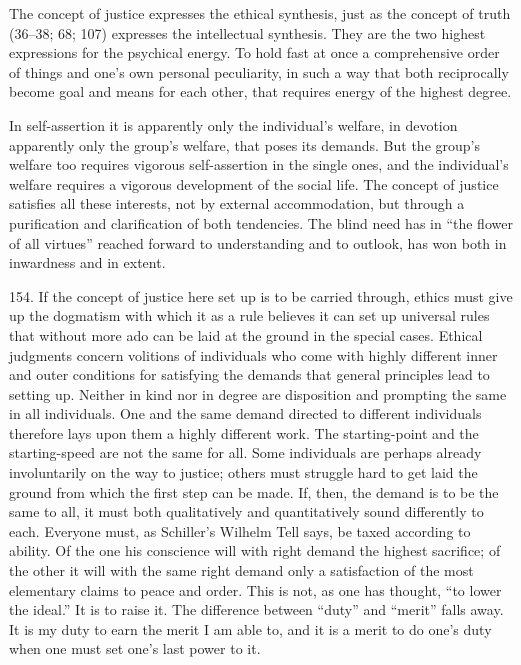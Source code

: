 \documentclass[12pt,a4paper]{book}
\newcommand{\opage}[1]{\marginnote{\footnotesize\textit{[#1]}}}
\begin{document}
The concept of justice expresses the ethical synthesis, just as the concept of truth (36--38; 68; 107) expresses
the intellectual synthesis. They are the two highest expressions for the psychical energy. To hold fast at once a
comprehensive order of things and one's own personal peculiarity, in such a way that both reciprocally become goal
and means for each other, that requires energy of the highest degree.

In self-assertion it is apparently only the individual's welfare, in devotion apparently only the group's welfare,
that poses its demands. But the group's welfare too requires vigorous self-assertion in the single ones, and the
individual's \opage{368}welfare requires a vigorous development of the social life. The concept of justice satisfies all these
interests, not by external accommodation, but through a purification and clarification of both tendencies. The blind
need has in ``the flower of all virtues'' reached forward to understanding and to outlook, has won both in inwardness
and in extent.

154. If the concept of justice here set up is to be carried through, ethics must give up the dogmatism with which it
as a rule believes it can set up universal rules that without more ado can be laid at the ground in the special
cases. Ethical judgments concern volitions of individuals who come with highly different inner and outer conditions
for satisfying the demands that general principles lead to setting up. Neither in kind nor in degree are disposition
and prompting the same in all individuals. One and the same demand directed to different individuals therefore lays
upon them a highly different work. The starting-point and the starting-speed are not the same for all. Some
individuals are perhaps already involuntarily on the way to justice; others must struggle hard to get laid the ground
from which the first step can be made. If, then, the demand is to be the same to all, it must both qualitatively and
quantitatively sound differently to each. Everyone must, as Schiller's Wilhelm Tell says, be taxed according to
ability. Of the one his conscience will with right demand the highest sacrifice; of the other it will with the same
right demand only a satisfaction of the most elementary claims to peace and order. This is not, as one has thought,
``to lower the ideal.'' It is to raise it. The difference between ``duty'' and ``merit'' falls away. It is my duty to
earn the merit I am able to, and it is a merit to do one's duty when one must set one's last power to it.
\end{document}
